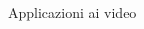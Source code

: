 \documentclass[aspectratio=169]{beamer}
\begin{document}
\begin{frame}{Applicazioni ai video}
\begin{columns}[T]
\begin{column}{.33\textwidth}
\begin{center}
            \end{center}
        \end{column}%
        \begin{column}{.33\textwidth}
            \begin{center}
            \end{center}
        \end{column}
    \end{columns}


\end{frame}
\end{document}

